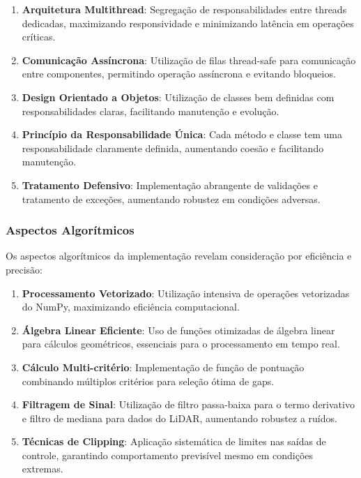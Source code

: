 \begin{enumerate}
    \item \textbf{Arquitetura Multithread}: Segregação de responsabilidades entre threads dedicadas, maximizando responsividade e minimizando latência em operações críticas.

    \item \textbf{Comunicação Assíncrona}: Utilização de filas thread-safe para comunicação entre componentes, permitindo operação assíncrona e evitando bloqueios.

    \item \textbf{Design Orientado a Objetos}: Utilização de classes bem definidas com responsabilidades claras, facilitando manutenção e evolução.

    \item \textbf{Princípio da Responsabilidade Única}: Cada método e classe tem uma responsabilidade claramente definida, aumentando coesão e facilitando manutenção.

    \item \textbf{Tratamento Defensivo}: Implementação abrangente de validações e tratamento de exceções, aumentando robustez em condições adversas.
\end{enumerate}

\subsubsection{Aspectos Algorítmicos}

Os aspectos algorítmicos da implementação revelam consideração por eficiência e
precisão:

\begin{enumerate}
    \item \textbf{Processamento Vetorizado}: Utilização intensiva de operações vetorizadas do NumPy, maximizando eficiência computacional.

    \item \textbf{Álgebra Linear Eficiente}: Uso de funções otimizadas de álgebra linear para cálculos geométricos, essenciais para o processamento em tempo real.

    \item \textbf{Cálculo Multi-critério}: Implementação de função de pontuação combinando múltiplos critérios para seleção ótima de gaps.

    \item \textbf{Filtragem de Sinal}: Utilização de filtro passa-baixa para o termo derivativo e filtro de mediana para dados do LiDAR, aumentando robustez a ruídos.

    \item \textbf{Técnicas de Clipping}: Aplicação sistemática de limites nas saídas de controle, garantindo comportamento previsível mesmo em condições extremas.
\end{enumerate}

